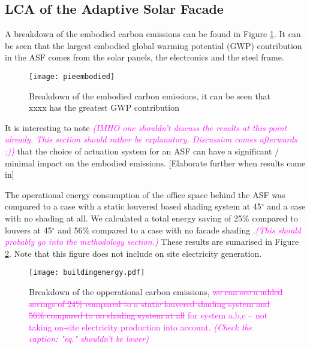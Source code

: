 
\subsection{LCA of the Adaptive Solar Facade}

A breakdown of the embodied carbon emissions can be found in Figure  \ref{fig:embodied}. It can be seen that the largest embodied global warming potential (GWP) contribution in the ASF comes from the solar panels, the electronics and the steel frame. 

\begin{figure}[H]
\begin{center}
\texttt{[image: pieembodied]}
\caption{Breakdown of the embodied carbon emissions, it can be seen that xxxx has the greatest GWP contribution}
\label{fig:embodied}
\end{center}
\end{figure}


It is interesting to note \textcolor{magenta}{\textit{(IMHO one shouldn't discuss the results at this point already. This section should rather be explanatory. Discussion comes afterwards ;))}} that the choice of actuation system for an ASF can have a significant / minimal impact on the embodied emissions. [Elaborate further when results come in]

The operational energy consumption of the office space behind the ASF was compared to a case with a static louvered based shading system at 45$^\circ$ and a case with no shading at all. We calculated a total energy saving of 25\% compared to louvers at 45$^\circ$ and 56\% compared to a case with no facade shading \cite{jayathissa2015abs}.\textcolor{magenta}{\textit{(This should probably go into the methodology section.)}} These results are sumarised in Figure \ref{fig:operational}. Note that this figure does not include on site electricity generation. 


\begin{figure}[H]
\begin{center}
\texttt{[image: buildingenergy.pdf]}
\caption{Breakdown of the opperational carbon emissions, \textcolor{magenta}{\sout{we can see a added savings of 24\% compared to a static louvered shading system and 56\% compared to no shading system at all} for system a,b,c -- not taking on-site electricity production into account. \textit{(Check the caption: "eq." shouldn't be lower)}}}
\label{fig:operational}
\end{center}
\end{figure}

